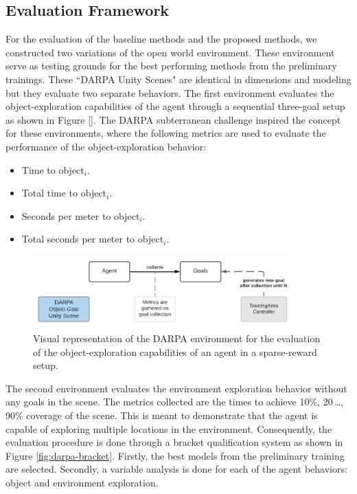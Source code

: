 \subsection{Evaluation Framework}\label{chap:3:further-use:evaluation-framework}
For the evaluation of the baseline methods and the proposed methods, we constructed two variations of the open world environment. These environment serve as testing grounds for the best performing methods from the preliminary trainings. These “DARPA Unity Scenes" are identical in dimensions and modeling but they evaluate two separate behaviors. The first environment evaluates the object-exploration capabilities of the agent through a sequential three-goal setup as shown in Figure \ref{}. The DARPA subterranean challenge \cite{darpa_subterranean_challenge} inspired the concept for these environments, where the following metrics are used to evaluate the performance of the object-exploration behavior:
\begin{multicols}{2}
    \begin{itemize}
        \item Time to object$_i$.
        \item Total time to object$_i$.
        \item Seconds per meter to object$_i$.
        \item Total seconds per meter to object$_i$.
    \end{itemize}
\end{multicols}
\begin{figure}[!ht]
        \centering
        \includegraphics[width=0.9\textwidth]{images/darpa-object-setup_3.png} 
        \caption{Visual representation of the DARPA environment for the evaluation of the object-exploration capabilities of an agent in a sparse-reward setup.}
        \label{fig:darpa-object-setup}
\end{figure}
The second environment evaluates the environment exploration behavior without any goals in the scene. The metrics collected are the times to achieve 10\%, 20\,…, 90\% coverage of the scene. This is meant to demonstrate that the agent is capable of exploring multiple locations in the environment.
Consequently, the evaluation procedure is done through a bracket qualification system as shown in Figure \ref{fig:darpa-bracket}. Firstly, the best models from the preliminary training are selected. Secondly, a variable analysis is done for each of the agent behaviors: object and environment exploration. 
